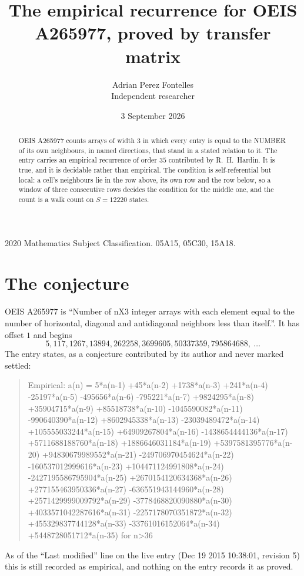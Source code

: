 \documentclass[11pt,a4paper]{article}
\title{The empirical recurrence for OEIS A265977, proved by transfer matrix}
\author{Adrian Perez Fontelles\\ \small Independent researcher}
\date{3 September 2026}
\theoremstyle{plain}
\theoremstyle{definition}
\begin{document}
\maketitle

\begin{abstract}
OEIS A265977 counts arrays of width $3$ in which every entry is equal to the NUMBER of its own
neighbours, in named directions, that stand in a stated relation to it. The entry carries an
empirical recurrence of order $35$ contributed by R.~H.~Hardin. It is true, and it is
decidable rather than empirical. The condition is self-referential but local: a cell's
neighbours lie in the row above, its own row and the row below, so a window of three
consecutive rows decides the condition for the middle one, and the count is a walk count on
$S=12220$ states.
\end{abstract}

\noindent\small 2020 Mathematics Subject Classification. 05A15, 05C30, 15A18.\normalsize

\section{The conjecture}

OEIS A265977 is ``Number of nX3 integer arrays with each element equal to the number of horizontal, diagonal and antidiagonal neighbors less than itself.''. It has offset $1$ and begins
\[
5, 117, 1267, 13894, 262258, 3699605, 50337359, 795864688,\ \dots
\]
The entry states, as a conjecture contributed by its author and never marked settled:
\begin{quote}
Empirical: a(n) = 5*a(n-1) +45*a(n-2) +1738*a(n-3) +241*a(n-4) -25197*a(n-5) -495656*a(n-6) -795221*a(n-7) +9824295*a(n-8) +35904715*a(n-9) +85518738*a(n-10) -1045590082*a(n-11) -990640390*a(n-12) +8602945338*a(n-13) -23039489472*a(n-14) +105555033244*a(n-15) +64909267804*a(n-16) -1438654444136*a(n-17) +5711688188760*a(n-18) +1886646031184*a(n-19) +5397581395776*a(n-20) +94830679989552*a(n-21) -249706970454624*a(n-22) -160537012999616*a(n-23) +104471124991808*a(n-24) -2427195586795904*a(n-25) +2670154120634368*a(n-26) +277155463950336*a(n-27) -636551943144960*a(n-28) +2571429999009792*a(n-29) -3778468820090880*a(n-30) +4033571042287616*a(n-31) -2257178070351872*a(n-32) +455329837744128*a(n-33) -33761016152064*a(n-34) +5448728051712*a(n-35) for n>36
\end{quote}
As of the ``Last modified'' line on the live entry (Dec 19 2015 10:38:01, revision 5) this is still
recorded as empirical, and nothing on the entry records it as proved.
\end{document}
